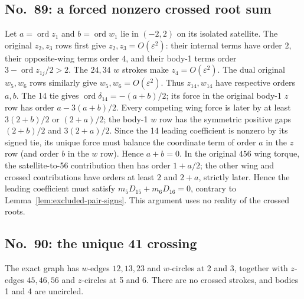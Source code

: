 \documentclass[11pt]{amsart}
\theoremstyle{remark}
\newcommand{\ord}{\operatorname{ord}}
\begin{document}
\subsection{No.~89: a forced nonzero crossed root sum}\label{sec:no89-torque}
Let $a=\ord z_1$ and $b=\ord w_1$ lie in $(-2,2)$ on its isolated satellite. The original $z_2,z_3$ rows first give $z_2,z_3=O(\varepsilon^2)$: their internal terms have order $2$, their opposite-wing terms order $4$, and their body-1 terms order $3-\ord z_{1j}/2>2$. The $24,34$ $w$ strokes make $z_4=O(\varepsilon^2)$. The dual original $w_5,w_6$ rows similarly give $w_5,w_6=O(\varepsilon^2)$. Thus $z_{14},w_{14}$ have respective orders $a,b$. The 14 tie gives $\ord\delta_{14}=-(a+b)/2$; its force in the original body-1 $z$ row has order $a-3(a+b)/2$. Every competing wing force is later by at least $3(2+b)/2$ or $(2+a)/2$; the body-1 $w$ row has the symmetric positive gaps $(2+b)/2$ and $3(2+a)/2$. Since the 14 leading coefficient is nonzero by its signed tie, its unique force must balance the coordinate term of order $a$ in the $z$ row (and order $b$ in the $w$ row). Hence $a+b=0$. In the original $456$ wing torque, the satellite-to-56 contribution then has order $1+a/2$; the other wing and crossed contributions have orders at least $2$ and $2+a$, strictly later. Hence the leading coefficient must satisfy $m_5D_{15}+m_6D_{16}=0$, contrary to Lemma~\ref{lem:excluded-pair-signs}. This argument uses no reality of the crossed roots.
\subsection{No.~90: the unique 41 crossing}\label{sec:no90-torque}
The exact graph has $w$-edges $12,13,23$ and $w$-circles at 2 and 3, together with $z$-edges $45,46,56$ and $z$-circles at 5 and 6. There are no crossed strokes, and bodies 1 and 4 are uncircled.
\end{document}
